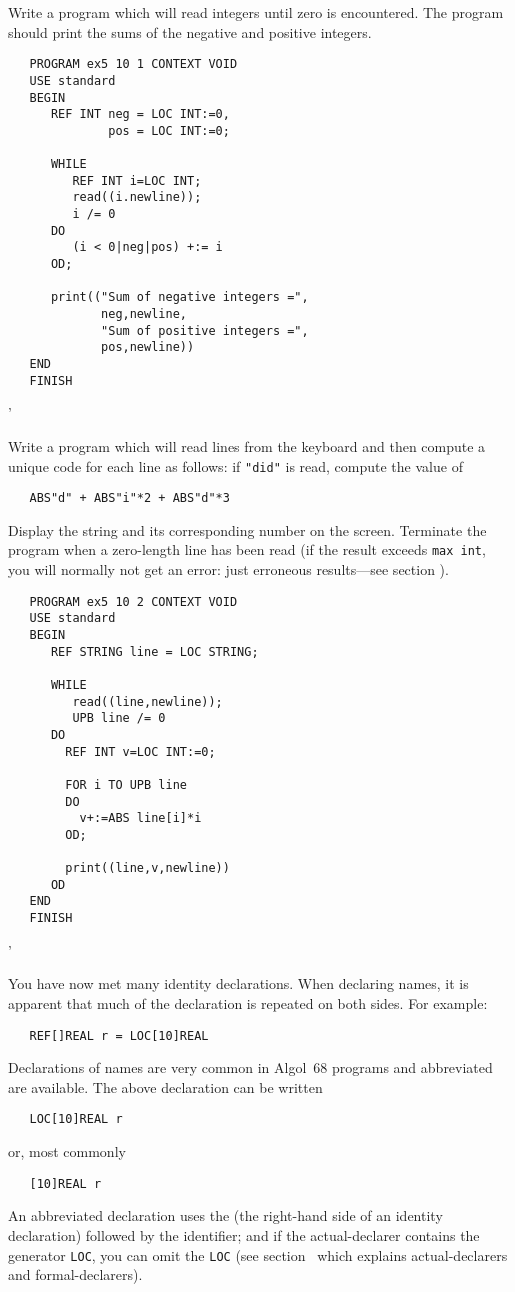 \begin{exercise}
\item Write a program which will read integers until zero is
encountered.  The program should print the sums of the negative and
positive integers. \ans \ %
\begin{verbatim}
   PROGRAM ex5 10 1 CONTEXT VOID
   USE standard
   BEGIN
      REF INT neg = LOC INT:=0,
              pos = LOC INT:=0;

      WHILE
         REF INT i=LOC INT;
         read((i.newline));
         i /= 0
      DO
         (i < 0|neg|pos) +:= i
      OD;

      print(("Sum of negative integers =",
             neg,newline,
             "Sum of positive integers =",
             pos,newline))
   END
   FINISH
\end{verbatim}
'
\item Write a program which will read lines from the keyboard and
then compute a unique code for each line as follows: if \verb|"did"|
is read, compute the value of
\begin{verbatim}
   ABS"d" + ABS"i"*2 + ABS"d"*3
\end{verbatim}
\noindent
Display the string and its corresponding number on the screen.
Terminate the program when a zero-length line has been read (if the
result exceeds \texttt{max int}, you will normally not get an error:
just erroneous results---see section ). \ans \ %
\begin{verbatim}
   PROGRAM ex5 10 2 CONTEXT VOID
   USE standard
   BEGIN
      REF STRING line = LOC STRING;

      WHILE
         read((line,newline));
         UPB line /= 0
      DO
        REF INT v=LOC INT:=0;

        FOR i TO UPB line
        DO
          v+:=ABS line[i]*i
        OD;

        print((line,v,newline))
      OD
   END
   FINISH
\end{verbatim}
'
\end{exercise}

You have now met many identity declarations. When declaring names, it
is apparent that much of the declaration is repeated on both sides.
For example:
\begin{verbatim}
   REF[]REAL r = LOC[10]REAL
\end{verbatim}
\noindent
Declarations of names are very common in Algol~68 programs and
abbreviated  are
available. The above declaration can be written
\begin{verbatim}
   LOC[10]REAL r
\end{verbatim}
\noindent
or, most commonly
\begin{verbatim}
   [10]REAL r
\end{verbatim}
\noindent
An abbreviated declaration uses the  (the
right-hand side of an identity declaration) followed by the
identifier; and if the actual-declarer contains the generator
\verb|LOC|, you can omit the \verb|LOC| (see
section~ which explains actual-declarers and
formal-declarers).

